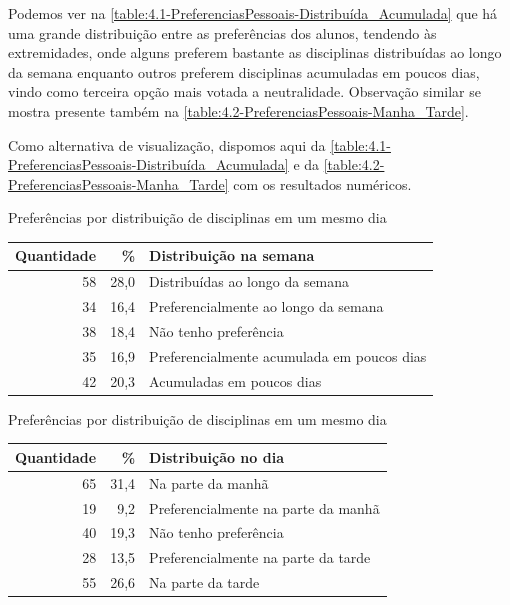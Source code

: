 \begin{apendicesenv}
  Podemos ver na \autoref{table:4.1-PreferenciasPessoais-Distribuída_Acumulada} que há uma grande distribuição entre as preferências dos alunos, tendendo às extremidades, onde alguns preferem bastante as disciplinas distribuídas ao longo da semana enquanto outros preferem disciplinas acumuladas em poucos dias, vindo como terceira opção mais votada a neutralidade. Observação similar se mostra presente também na \autoref{table:4.2-PreferenciasPessoais-Manha_Tarde}.

  Como alternativa de visualização, dispomos aqui da \autoref{table:4.1-PreferenciasPessoais-Distribuída_Acumulada} e da \autoref{table:4.2-PreferenciasPessoais-Manha_Tarde} com os resultados numéricos.

  \begin{CenteredTable} \caption{Preferências por distribuição de disciplinas em um mesmo dia} \label{table:4.1-PreferenciasPessoais-Distribuída_Acumulada}
    \begin{tabular}{| r r l |}
      \hline
      \textbf{Quantidade} & \%   & \textbf{Distribuição na semana}            \\
      \hline
      58                  & 28,0 & Distribuídas ao longo da semana            \\
      34                  & 16,4 & Preferencialmente ao longo da semana       \\
      38                  & 18,4 & Não tenho preferência                      \\
      35                  & 16,9 & Preferencialmente acumulada em poucos dias \\
      42                  & 20,3 & Acumuladas em poucos dias                  \\
      \hline
    \end{tabular}
  \end{CenteredTable}

  \begin{CenteredTable} \caption{Preferências por distribuição de disciplinas em um mesmo dia} \label{table:4.2-PreferenciasPessoais-Manha_Tarde}
    \begin{tabular}{| r r l |}
      \hline
      \textbf{Quantidade} & \%   & \textbf{Distribuição no dia}        \\
      \hline
      65                  & 31,4 & Na parte da manhã                   \\
      19                  & 9,2  & Preferencialmente na parte da manhã \\
      40                  & 19,3 & Não tenho preferência               \\
      28                  & 13,5 & Preferencialmente na parte da tarde \\
      55                  & 26,6 & Na parte da tarde                   \\
      \hline
    \end{tabular}
  \end{CenteredTable}


\end{apendicesenv}

